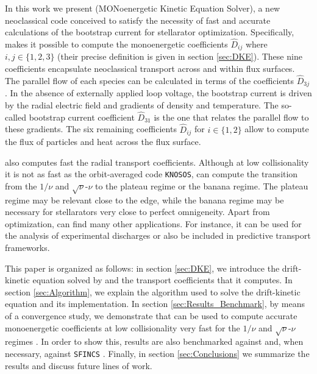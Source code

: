 In this work we present {\MONKES} (MONoenergetic Kinetic Equation Solver), a new neoclassical code conceived to satisfy the necessity of fast and accurate calculations of the bootstrap current for stellarator optimization. Specifically, {\MONKES} makes it possible to compute the monoenergetic coefficients $\widehat{D}_{ij}$ where $i,j\in\{1,2,3\}$ (their precise definition is given in section \ref{sec:DKE}). These nine coefficients encapsulate neoclassical transport across and within flux surfaces. The parallel flow of each species can be calculated in terms of the coefficients $\widehat{D}_{3j}$ \cite{Taguchi,Sugama-PENTA,Sugama2008,MaasbergMomentumCorrection}. In the absence of externally applied loop voltage, the bootstrap current is driven by the radial electric field and gradients of density and temperature. The so-called bootstrap current coefficient $\widehat{D}_{31}$ is the one that relates the parallel flow to these gradients. The six remaining coefficients $\widehat{D}_{ij}$ for $i\in\{1,2\}$ allow to compute the flux of particles and heat across the flux surface. 

{\MONKES} also computes fast the radial transport coefficients. Although at low collisionality it is not as fast as the orbit-averaged code \texttt{KNOSOS}, {\MONKES} can compute the transition from the $1/\nu$ and $\sqrt{\nu}$-$\nu$ to the plateau regime or the banana regime. The plateau regime may be relevant close to the edge, while the banana regime may be necessary for stellarators very close to perfect omnigeneity. Apart from optimization, {\MONKES} can find many other applications. For instance, it can be used for the analysis of experimental discharges or also be included in predictive transport frameworks.


This paper is organized as follows: in section \ref{sec:DKE}, we introduce the drift-kinetic equation solved by {\MONKES} and the transport coefficients that it computes. In section \ref{sec:Algorithm}, we explain the algorithm used to solve the drift-kinetic equation and its implementation. In section \ref{sec:Results_Benchmark}, by means of a convergence study, we demonstrate that {\MONKES} can be used to compute accurate monoenergetic coefficients at low collisionality very fast for the $1/\nu$ and $\sqrt{\nu}$-$\nu$ regimes \cite{dherbemont2022}. In order to show this, {\MONKES} results are also benchmarked against {\DKES} \cite{DKES1986,VanRij_1989} and, when necessary, against {\texttt{SFINCS}} \cite{Landreman_2014}. Finally, in section \ref{sec:Conclusions} we summarize the results and discuss future lines of work.

































